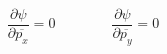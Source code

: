 \begin{equation}
{\frac{\partial \psi}{\partial \overline{p_x}}} =0 \qquad\qquad
	{\frac{\partial \psi}{\partial \overline{p_y}}} =0
\label{eq:cauchyriemann}
\end{equation}


